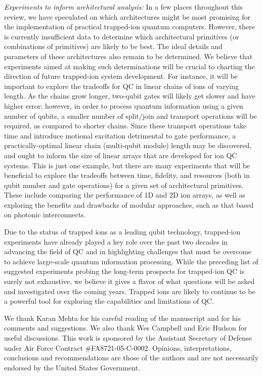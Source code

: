 \documentclass[%
reprint,
 amsmath,amssymb,
]{revtex4-1}
\begin{document}
\textit{Experiments to inform architectural analysis:} In a few places throughout this review, we have speculated on which architectures might be most promising for the implementation of practical trapped-ion quantum computers.  However, there is currently insufficient data to determine which architectural primitives (or combinations of primitives) are likely to be best.  The ideal details and parameters of these architectures also remain to be determined.  We believe that experiments aimed at making such determinations will be crucial to charting the direction of future trapped-ion system development.  For instance, it will be important to explore the tradeoffs for QC in linear chains of ions of varying length.  As the chains grow longer, two-qubit gates will likely get slower and have higher error; however, in order to process quantum information using a given number of qubits, a smaller number of split/join and transport operations will be required, as compared to shorter chains.  Since these transport operations take time and introduce motional excitation detrimental to gate performance, a practically-optimal linear chain (multi-qubit module) length may be discovered, and ought to inform the size of linear arrays that are developed for ion QC systems.  This is just one example, but there are many experiments that will be beneficial to explore the tradeoffs between time, fidelity, and resources (both in qubit number and gate operations) for a given set of architectural primitives.  These include comparing the performance of 1D and 2D ion arrays, as well as exploring the benefits and drawbacks of modular approaches, such as that based on photonic interconnects.

Due to the status of trapped ions as a leading qubit technology, trapped-ion experiments have already played a key role over the past two decades in advancing the field of QC and in highlighting challenges that must be overcome to achieve large-scale quantum information processing. While the preceding list of suggested experiments probing the long-term prospects for trapped-ion QC is surely not exhaustive, we believe it gives a flavor of what questions will be asked and investigated over the coming years. Trapped ions are likely to continue to be a powerful tool for exploring the capabilities and limitations of QC.

\begin{acknowledgments}
We thank Karan Mehta for his careful reading of the manuscript and for his comments and suggestions.  We also thank Wes Campbell and Eric Hudson for useful discussions.  This work is sponsored by the Assistant Secretary of Defense under Air Force Contract $\#$FA8721-05-C-0002. Opinions, interpretations, conclusions and recommendations are those of the authors and are not necessarily endorsed by the United States Government.
\end{acknowledgments}



\end{document}
